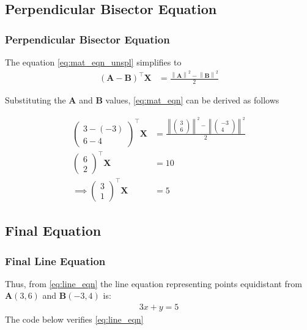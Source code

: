\documentclass{beamer}
\providecommand{\brak}[1]{\ensuremath{\left(#1\right)}}
\theoremstyle{remark}
\providecommand{\norm}[1]{\left\lVert#1\right\rVert}
\newcommand{\myvec}[1]{\ensuremath{\begin{pmatrix}#1\end{pmatrix}}}
\let\vec\mathbf
\numberwithin{equation}{section}
\begin{document}
\subsection{Perpendicular Bisector Equation}
\begin{frame}
\frametitle{Perpendicular Bisector Equation}

The equation \eqref{eq:mat_eqn_unspl} simplifies to
\begin{align}
    \label{eq:mat_eqn}
	\brak{\vec{A} - \vec{B}}^\top \vec{X} &= \frac{\norm{\vec{A}}^2 - \norm{\vec{B}}^2}{2}
\end{align}

Substituting the $\vec{A}$ and $\vec{B}$ values, \eqref{eq:mat_eqn} can be derived as follows

\begin{align}
    \myvec{3-(-3) \\ 6-4}^\top \vec{X} &= \frac{\norm{\myvec{3 \\ 6}}^2-\norm{\myvec{-3 \\ 4}}^2}{2} \\
    \myvec{6 \\ 2}^\top \vec{X} &= 10 \\
    \label{eq:line_eqn} \implies \myvec{3 \\ 1}^\top \vec{X} &= 5
\end{align}
\end{frame}

\subsection{Final Equation}
\begin{frame}
\frametitle{Final Line Equation}
Thus, from \eqref{eq:line_eqn} the line equation representing points equidistant from $\vec{A}(3, 6)$ and $\vec{B}(-3, 4)$ is:
\begin{align}
	3x + y = 5
\end{align}
The code below verifies \eqref{eq:line_eqn}
\end{frame}



\end{document}
